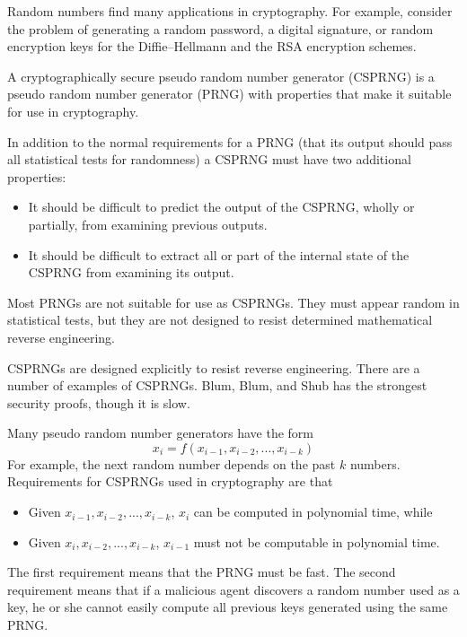 \documentclass[justified,sixbynine]{tufte-book}
\theoremstyle{plain}%
\theoremstyle{definition}
\theoremstyle{remark}
\begin{document}
\begin{fullwidth}
Random numbers find many applications in cryptography. For example, consider
the problem of generating a random password, a digital signature, or random
encryption keys for the Diffie--Hellmann and the RSA encryption schemes.

A cryptographically secure pseudo random number generator (CSPRNG) is a
pseudo random number generator (PRNG) with properties that make it suitable
for use in cryptography.

In addition to the normal requirements for a PRNG (that its output
should pass all statistical tests for randomness) a CSPRNG must have two
additional properties:

\begin{itemize}
\item  It should be difficult to predict the output of the CSPRNG, wholly or
partially, from examining previous outputs.

\item  It should be difficult to extract all or part of the internal state
of the CSPRNG from examining its output.
\end{itemize}

Most PRNGs are not suitable for use as CSPRNGs. They must appear random
in statistical tests, but they are not designed to resist determined
mathematical reverse engineering.

CSPRNGs are designed explicitly to resist reverse engineering. There are a
number of examples of CSPRNGs. Blum, Blum, and Shub has the strongest security
proofs, though it is slow.

Many pseudo random number generators have the form
\begin{equation}
x_i=f(x_{i-1},x_{i-2},...,x_{i-k})
\end{equation}
For example, the next random number depends on the past $k$ numbers. Requirements for CSPRNGs used in cryptography are that

\begin{itemize}
\item  Given $x_{i-1},x_{i-2},...,x_{i-k}$, $x_i$ can be computed in
polynomial time, while

\item  Given $x_i,x_{i-2},...,x_{i-k}$, $x_{i-1}$ must not be computable in
polynomial time.
\end{itemize}

The first requirement means that the PRNG must be fast. The second
requirement means that if a malicious agent discovers a random number used
as a key, he or she cannot easily compute all previous keys generated using the
same PRNG.


\end{fullwidth}
\end{document}
